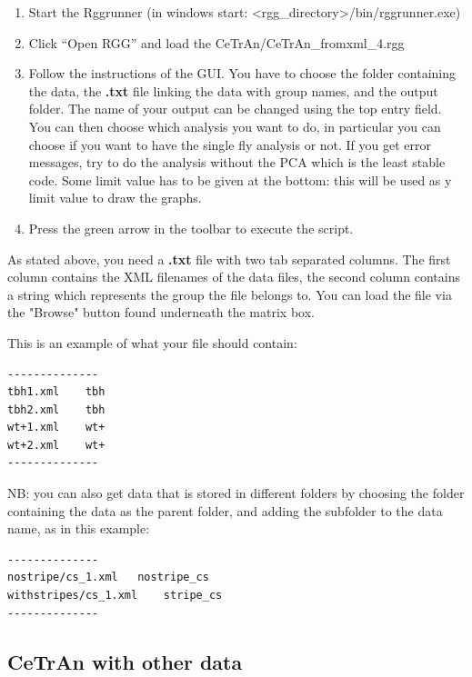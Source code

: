\documentclass[11pt,a4paper]{article}
\begin{document}
\begin{enumerate}
\item Start the Rggrunner (in windows start: <rgg\_directory>/bin/rggrunner.exe)

\item Click "`Open RGG"' and load the CeTrAn/CeTrAn\_fromxml\_4.rgg

\item Follow the instructions of the GUI. You have to choose the folder containing the data, the {\bf .txt} file linking the data with group names, and the output folder. The name of your output can be changed using the top entry field.
You can then choose which analysis you want to do, in particular you can choose if you want to have the single fly analysis or not. If you get error messages, try to do the analysis without the PCA which is the least stable code. Some limit value has to be given at the bottom: this will be used as y limit value to draw the graphs. 

\item Press the green arrow in the toolbar to execute the script.

\end{enumerate}

As stated above, you need a {\bf.txt} file with two tab separated columns. The first column contains the XML filenames of the data files, the second column contains a string which represents the group the file belongs to. You can load the file via the "Browse" button found underneath the matrix box.

\medskip 

This is an example of what your file should contain:

\begin{lstlisting}
--------------
tbh1.xml	tbh
tbh2.xml	tbh
wt+1.xml	wt+
wt+2.xml	wt+
--------------
\end{lstlisting}

NB: you can also get data that is stored in different folders by choosing the folder containing the data
as the parent folder, and adding the subfolder to the data name, as in this example:

\begin{lstlisting}
--------------
nostripe/cs_1.xml	nostripe_cs
withstripes/cs_1.xml	stripe_cs
--------------
\end{lstlisting}

\subsection{CeTrAn with other data}
\end{document}
